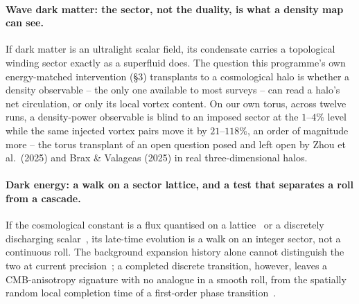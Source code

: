 \documentclass[11pt,a4paper]{article}
\begin{document}
\paragraph{Wave dark matter: the sector, not the duality, is what a density map can see.} If dark
matter is an ultralight scalar field, its condensate carries a topological winding sector exactly as a
superfluid does. The question this programme's own energy-matched intervention (\S3) transplants to a
cosmological halo is whether a density observable -- the only one available to most surveys -- can
read a halo's net circulation, or only its local vortex content. On our own torus, across twelve runs,
a density-power observable is blind to an imposed sector at the $1$--$4\%$ level while the same
injected vortex pairs move it by $21$--$118\%$, an order of magnitude more -- the torus transplant of
an open question posed and left open by Zhou et al.\ (2025) and Brax \& Valageas (2025) in real
three-dimensional halos.

\paragraph{Dark energy: a walk on a sector lattice, and a test that separates a roll from a cascade.}
If the cosmological constant is a flux quantised on a lattice~\cite{BoussoPolchinski2000} or a
discretely discharging scalar~\cite{Kaloper2025}, its late-time evolution is a walk on an integer
sector, not a continuous roll. The background expansion history alone cannot distinguish the two at
current precision~\cite{DESI2025DR2,Lodha2025}; a completed discrete transition, however, leaves a
CMB-anisotropy signature with no analogue in a smooth roll, from the spatially random local completion
time of a first-order phase transition~\cite{KorenTsaiWang2025,BaiLuOrlofsky2026}.
\end{document}
